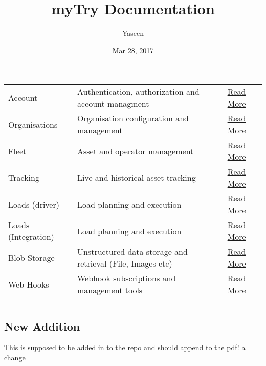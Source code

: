 \documentclass[letterpaper,10pt,english]{sphinxmanual}
\title{myTry Documentation}
\date{Mar 28, 2017}
\author{Yaseen}
\begin{document}
\maketitle
\sphinxtableofcontents
{}\label{\detokenize{index::doc}}


\noindent\begin{tabulary}{\linewidth}{|L|L|L|}
\hline
{}\relax &\relax &\relax \\
\hline
Account
&
Authentication, authorization and account managment
&
\href{http://secure.trackmatic.co.za/documentation/account.html}{Read More}
\\
\hline
Organisations
&
Organisation configuration and management
&
\href{http://secure.trackmatic.co.za/documentation/organisations.html}{Read More}
\\
\hline
Fleet
&
Asset and operator management
&
\href{http://secure.trackmatic.co.za/documentation/fleet.html}{Read More}
\\
\hline
Tracking
&
Live and historical asset tracking
&
\href{http://secure.trackmatic.co.za/documentation/tracking.html}{Read More}
\\
\hline
Loads (driver)
&
Load planning and execution
&
\href{http://secure.trackmatic.co.za/documentation/loads-drivers.html}{Read More}
\\
\hline
Loads (Integration)
&
Load planning and execution
&
\href{http://secure.trackmatic.co.za/documentation/loads-integration.html}{Read More}
\\
\hline
Blob Storage
&
Unstructured data storage and retrieval (File, Images etc)
&
\href{http://secure.trackmatic.co.za/documentation/blob-storage.html}{Read More}
\\
\hline
Web Hooks
&
Webhook subscriptions and management tools
&
\href{http://secure.trackmatic.co.za/documentation/webhooks.html}{Read More}
\\
\hline\end{tabulary}



\chapter{}
\label{\detokenize{index:welcome-to-trackmatic-api-s-documentation}}\label{\detokenize{index:trackmatic}}

\section{New Addition}
\label{\detokenize{newAmend:new-addition}}\label{\detokenize{newAmend::doc}}
This is supposed to be added in to the repo and should append to the pdf!
a change
\end{document}

